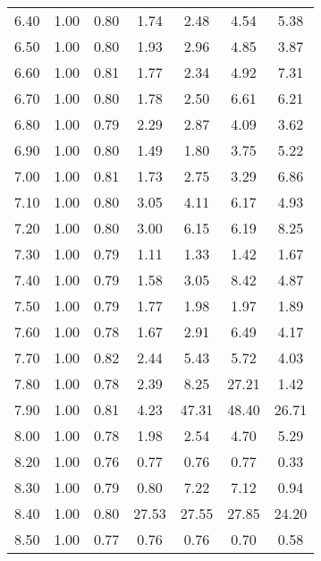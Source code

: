 \begin{table}
\begin{tabular}{lcccccc}
6.40 & 1.00 & 0.80 & 1.74 & 2.48 & 4.54 & 5.38 \\
6.50 & 1.00 & 0.80 & 1.93 & 2.96 & 4.85 & 3.87 \\
6.60 & 1.00 & 0.81 & 1.77 & 2.34 & 4.92 & 7.31 \\
6.70 & 1.00 & 0.80 & 1.78 & 2.50 & 6.61 & 6.21 \\
6.80 & 1.00 & 0.79 & 2.29 & 2.87 & 4.09 & 3.62 \\
6.90 & 1.00 & 0.80 & 1.49 & 1.80 & 3.75 & 5.22 \\
7.00 & 1.00 & 0.81 & 1.73 & 2.75 & 3.29 & 6.86 \\
7.10 & 1.00 & 0.80 & 3.05 & 4.11 & 6.17 & 4.93 \\
7.20 & 1.00 & 0.80 & 3.00 & 6.15 & 6.19 & 8.25 \\
7.30 & 1.00 & 0.79 & 1.11 & 1.33 & 1.42 & 1.67 \\
7.40 & 1.00 & 0.79 & 1.58 & 3.05 & 8.42 & 4.87 \\
7.50 & 1.00 & 0.79 & 1.77 & 1.98 & 1.97 & 1.89 \\
7.60 & 1.00 & 0.78 & 1.67 & 2.91 & 6.49 & 4.17 \\
7.70 & 1.00 & 0.82 & 2.44 & 5.43 & 5.72 & 4.03 \\
7.80 & 1.00 & 0.78 & 2.39 & 8.25 & 27.21 & 1.42 \\
7.90 & 1.00 & 0.81 & 4.23 & 47.31 & 48.40 & 26.71 \\
8.00 & 1.00 & 0.78 & 1.98 & 2.54 & 4.70 & 5.29 \\
8.20 & 1.00 & 0.76 & 0.77 & 0.76 & 0.77 & 0.33 \\
8.30 & 1.00 & 0.79 & 0.80 & 7.22 & 7.12 & 0.94 \\
8.40 & 1.00 & 0.80 & 27.53 & 27.55 & 27.85 & 24.20 \\
8.50 & 1.00 & 0.77 & 0.76 & 0.76 & 0.70 & 0.58 \\
\bottomrule
\end{tabular}
\end{table}
